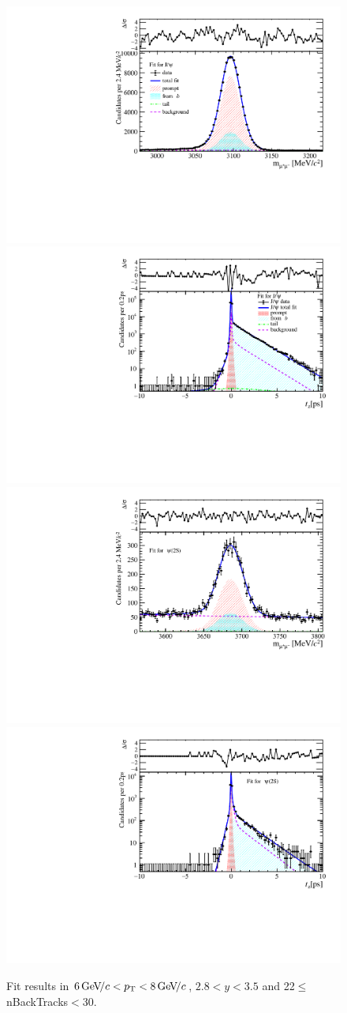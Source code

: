 \begin{figure}[H]
\begin{center}
\includegraphics[width=0.47\linewidth]{pdf/Jpsi/drawmassB/n4y2pt4.pdf}
\includegraphics[width=0.47\linewidth]{pdf/Jpsi/2DFitB/n4y2pt4.pdf}
\vspace*{-0.5cm}
\includegraphics[width=0.47\linewidth]{pdf/Psi2S/drawmassB/n4y2pt4.pdf}
\includegraphics[width=0.47\linewidth]{pdf/Psi2S/2DFitB/n4y2pt4.pdf}
\vspace*{-0.5cm}
\end{center}
\caption{Fit results in $6\text{\,Ge\kern -0.1em V\!/}c<p_{\mathrm{T}}<8\text{\,Ge\kern -0.1em V\!/}c$, $2.8<y<3.5$ and 22$\leq$nBackTracks$<$30.}
\label{Fitn4y2pt4}
\end{figure}
